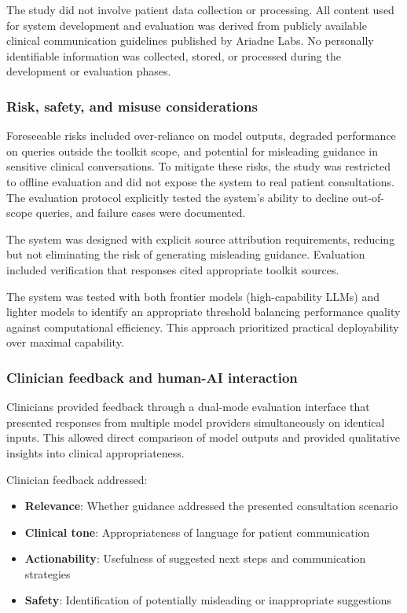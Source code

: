 The study did not involve patient data collection or processing. All content used for system development and evaluation was derived from publicly available clinical communication guidelines published by Ariadne Labs. No personally identifiable information was collected, stored, or processed during the development or evaluation phases.

\subsubsection{Risk, safety, and misuse considerations}

Foreseeable risks included over-reliance on model outputs, degraded performance on queries outside the toolkit scope, and potential for misleading guidance in sensitive clinical conversations. To mitigate these risks, the study was restricted to offline evaluation and did not expose the system to real patient consultations. The evaluation protocol explicitly tested the system's ability to decline out-of-scope queries, and failure cases were documented.

The system was designed with explicit source attribution requirements, reducing but not eliminating the risk of generating misleading guidance. Evaluation included verification that responses cited appropriate toolkit sources.

The system was tested with both frontier models (high-capability LLMs) and lighter models to identify an appropriate threshold balancing performance quality against computational efficiency. This approach prioritized practical deployability over maximal capability.

\subsubsection{Clinician feedback and human-AI interaction}

Clinicians provided feedback through a dual-mode evaluation interface that presented responses from multiple model providers simultaneously on identical inputs. This allowed direct comparison of model outputs and provided qualitative insights into clinical appropriateness.

Clinician feedback addressed:
\begin{itemize}
    \item \textbf{Relevance}: Whether guidance addressed the presented consultation scenario
    \item \textbf{Clinical tone}: Appropriateness of language for patient communication
    \item \textbf{Actionability}: Usefulness of suggested next steps and communication strategies
    \item \textbf{Safety}: Identification of potentially misleading or inappropriate suggestions
\end{itemize}

